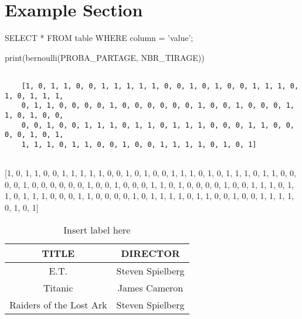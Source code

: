 \section{Example Section} \label{sec:-example-section}

\begin{sqlcode}

    SELECT * FROM table WHERE column = 'value';

\end{sqlcode}

\begin{pythoncode}

    print(bernoulli(PROBA_PARTAGE, NBR_TIRAGE))

\end{pythoncode}

\begin{verbatim}

    [1, 0, 1, 1, 0, 0, 1, 1, 1, 1, 1, 0, 0, 1, 0, 1, 0, 0, 1, 1, 1, 0, 1, 0, 1, 1, 1,
    0, 1, 1, 0, 0, 0, 0, 1, 0, 0, 0, 0, 0, 0, 1, 0, 0, 1, 0, 0, 0, 1, 1, 0, 1, 0, 0,
    0, 0, 1, 0, 0, 1, 1, 1, 0, 1, 1, 0, 1, 1, 1, 0, 0, 0, 1, 1, 0, 0, 0, 0, 1, 0, 1,
    1, 1, 1, 0, 1, 1, 0, 0, 1, 0, 0, 1, 1, 1, 1, 0, 1, 0, 1]


\end{verbatim}

\begin{consolecode}

    [1, 0, 1, 1, 0, 0, 1, 1, 1, 1, 1, 0, 0, 1, 0, 1, 0, 0, 1, 1, 1, 0, 1, 0, 1, 1, 1,
    0, 1, 1, 0, 0, 0, 0, 1, 0, 0, 0, 0, 0, 0, 1, 0, 0, 1, 0, 0, 0, 1, 1, 0, 1, 0, 0,
    0, 0, 1, 0, 0, 1, 1, 1, 0, 1, 1, 0, 1, 1, 1, 0, 0, 0, 1, 1, 0, 0, 0, 0, 1, 0, 1,
    1, 1, 1, 0, 1, 1, 0, 0, 1, 0, 0, 1, 1, 1, 1, 0, 1, 0, 1]

\end{consolecode}

\begin{table}[ht]
    \centering
    \begin{tabular}[t]{cc}
        \toprule
        \color{Poly-Blue}\textbf{TITLE} &
        \color{Poly-Blue}\textbf{DIRECTOR}\\
        \midrule
        E.T. & Steven Spielberg\\
        Titanic & James Cameron\\
        Raiders of the Lost Ark & Steven Spielberg\\
        \bottomrule
    \end{tabular}
    \caption{Insert label here}
    \label{Insert label here}
\end{table}